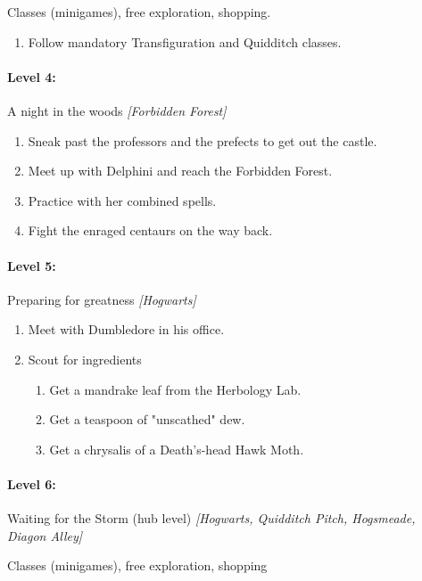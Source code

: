 Classes (minigames), free exploration, shopping.
\begin{enumerate}[1)]
	\item Follow mandatory Transfiguration and Quidditch classes.
\end{enumerate}

\paragraph{Level 4:} A night in the woods \textit{[Forbidden Forest]}
\begin{enumerate}[1)]
	\item Sneak past the professors and the prefects to get out the castle.
	\item Meet up with Delphini and reach the Forbidden Forest.
	\item Practice with her combined spells.
	\item Fight the enraged centaurs on the way back.
\end{enumerate}

\paragraph{Level 5:} Preparing for greatness \textit{[Hogwarts]}
\begin{enumerate}[1)]
	\item Meet with Dumbledore in his office.
	\item Scout for ingredients
	\begin{enumerate}[1.]
		\item Get a mandrake leaf from the Herbology Lab.
		\item Get a teaspoon of "unscathed" dew.
		\item Get a chrysalis of a Death's-head Hawk Moth.
	\end{enumerate}
\end{enumerate}

\paragraph{Level 6:} Waiting for the Storm (hub level) \textit{[Hogwarts, Quidditch Pitch, Hogsmeade, Diagon Alley]}

Classes (minigames), free exploration, shopping

